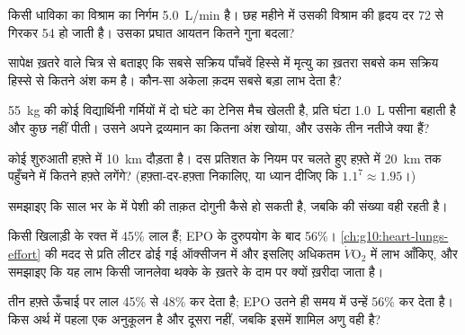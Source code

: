 \begin{exercise}[$\star\star$]\label{exo:g10:sport-and-health:7}
किसी धाविका का विश्राम का निर्गम \qty{5.0}{L/min} है। छह महीने में उसकी
विश्राम की हृदय दर 72 से गिरकर 54 हो जाती है। उसका प्रघात आयतन कितने गुना
बदला?
\end{exercise}

\begin{exercise}[$\star\star$]\label{exo:g10:sport-and-health:8}
सापेक्ष ख़तरे वाले चित्र से बताइए कि सबसे सक्रिय पाँचवें हिस्से में
मृत्यु का ख़तरा सबसे कम सक्रिय हिस्से से कितने अंश कम है। कौन-सा अकेला
क़दम सबसे बड़ा लाभ देता है?
\end{exercise}

\begin{exercise}[$\star\star$]\label{exo:g10:sport-and-health:9}
\qty{55}{kg} की कोई विद्यार्थिनी गर्मियों में दो घंटे का टेनिस मैच खेलती
है, प्रति घंटा \qty{1.0}{L} पसीना बहाती है और कुछ नहीं पीती। उसने अपने
द्रव्यमान का कितना अंश खोया, और उसके तीन नतीजे क्या हैं?
\end{exercise}

\begin{exercise}[$\star\star$]\label{exo:g10:sport-and-health:10}
कोई शुरुआती हफ़्ते में \qty{10}{km} दौड़ता है। दस प्रतिशत के नियम पर चलते
हुए हफ़्ते में \qty{20}{km} तक पहुँचने में कितने हफ़्ते लगेंगे?
(हफ़्ता-दर-हफ़्ता निकालिए, या ध्यान दीजिए कि $1.1^7 \approx 1.95$।)
\end{exercise}

\begin{exercise}[$\star\star$]\label{exo:g10:sport-and-health:11}
समझाइए कि साल भर के  में पेशी की ताक़त दोगुनी कैसे हो सकती है,
जबकि  की संख्या वही रहती है।
\end{exercise}

\begin{exercise}[$\star\star\star$]\label{exo:g10:sport-and-health:12}
किसी खिलाड़ी के रक्त में 45\% लाल  हैं; EPO के दुरुपयोग के बाद
56\%। \cref{ch:g10:heart-lungs-effort} की मदद से प्रति लीटर ढोई गई
ऑक्सीजन में और इसलिए अधिकतम $\dot V\!\mathrm{O_2}$ में लाभ आँकिए, और
समझाइए कि यह लाभ किसी जानलेवा थक्के के ख़तरे के दाम पर क्यों ख़रीदा जाता
है।
\end{exercise}

\begin{exercise}[$\star\star\star$]\label{exo:g10:sport-and-health:13}
तीन हफ़्ते ऊँचाई पर  लाल  45\% से 48\% कर देता है; EPO
उतने ही समय में उन्हें 56\% कर देता है। किस अर्थ में पहला एक अनुकूलन है
और दूसरा नहीं, जबकि इसमें शामिल अणु वही है?
\end{exercise}

